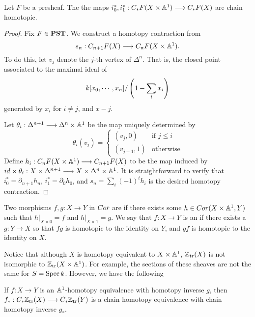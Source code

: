 \begin{lem}\label{lem_hi_implies_i0_i1_homotopic}
Let $F$ be a presheaf. The the maps $i_0^*, i_1^* : 
\suslC F(X \times \A^1) \to \suslC F(X)$ are chain homotopic.
\end{lem}
\begin{proof}
Fix $F \in \PST$. We construct a homotopy contraction from
\[
s_n : \suslC[n + 1] F(X) \to \suslC[n] F(X \times \A^1).
\]
To do this, let $v_j$ denote the $j$-th vertex of $\Delta^n$. That
is, the closed point associated to the maximal ideal of
\[
\basefield [x_0,\cdots,x_{n}]/\left(1 - \sum_{i} x_i \right)
\]
generated by $x_i$ for $i \neq j$, and $x - j$.

Let $\theta_i: \Delta^{n + 1} \to \Delta^n \times \A^1$ be the map
uniquely determined by
\[
\theta_i(v_j) = \begin{cases}
(v_j, 0) & \textrm{if }j \leq i \\
(v_{j - 1}, 1) & \textrm{otherwise}
\end{cases}
\]
Define $h_i : \suslC[n] F(X \times \A^1) \to \suslC[n + 1] F(X)$ 
to be the map induced by $id \times \theta_i : X \times 
\Delta^{n + 1} \to X \times \Delta^n \times \A^1$. It is 
straightforward to verify that $i_0^* = \partial_{n + 1}h_n$,
$i_1^* = \partial_0 h_0$, and $s_n = \sum_i (-1)^i h_i$ is the 
desired homotopy contraction.
\end{proof}

\begin{defn}
Two morphisms $f, g: X \to Y$ in $\Cor$ are  
if there exists some $h \in \Cor(X \times \A^1, Y)$ such that 
$h|_{X \times 0} = f$ and $h|_{X \times 1} = g$. We say that $f: X 
\to Y$ is an  if there exists a 
$g: Y \to X$ so that $fg$ is homotopic to the identity on $Y$, and
$gf$ is homotopic to the identity on $X$.
\end{defn}

Notice that although $X$ is homotopy equivalent to $X \times \A^1$,
$\Ztr(X)$ is not isomorphic to $\Ztr(X \times \A^1)$. For example,
the sections of these sheaves are not the same for $S = \Spec 
\basefield$. However, we have the following

\begin{prop}\label{prop_a1_hom_implies_hom}
If $f: X \to Y$ is an $\A^1$-homotopy equivalence with homotopy
inverse $g$, then $f_*: \suslC \Ztr(X) \to \suslC \Ztr(Y)$ is a 
chain homotopy equivalence with chain homotopy inverse $g_*$.
\end{prop}

